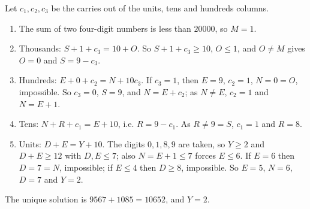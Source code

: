 Let $c_1,c_2,c_3$ be the carries out of the units, tens and hundreds columns.
\begin{enumerate}
\item The sum of two four-digit numbers is less than $20000$, so $M=1$.
\item Thousands: $S+1+c_3=10+O$. So $S+1+c_3\ge10$, $O\le1$, and $O\ne M$ gives $O=0$ and $S=9-c_3$.
\item Hundreds: $E+0+c_2=N+10c_3$. If $c_3=1$, then $E=9$, $c_2=1$, $N=0=O$, impossible. So $c_3=0$, $S=9$, and $N=E+c_2$; as $N\ne E$, $c_2=1$ and $N=E+1$.
\item Tens: $N+R+c_1=E+10$, i.e. $R=9-c_1$. As $R\ne9=S$, $c_1=1$ and $R=8$.
\item Units: $D+E=Y+10$. The digits $0,1,8,9$ are taken, so $Y\ge2$ and $D+E\ge12$ with $D,E\le7$; also $N=E+1\le7$ forces $E\le6$. If $E=6$ then $D=7=N$, impossible; if $E\le4$ then $D\ge8$, impossible. So $E=5$, $N=6$, $D=7$ and $Y=2$.
\end{enumerate}
The unique solution is $9567+1085=10652$, and $Y=\boxed{2}$.
